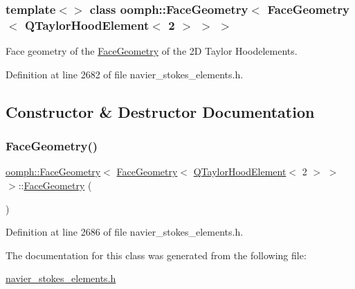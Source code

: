 \subsubsection*{template$<$$>$\newline
class oomph\+::\+Face\+Geometry$<$ Face\+Geometry$<$ Q\+Taylor\+Hood\+Element$<$ 2 $>$ $>$ $>$}

Face geometry of the \hyperlink{classoomph_1_1FaceGeometry}{Face\+Geometry} of the 2D Taylor Hoodelements. 

Definition at line 2682 of file navier\+\_\+stokes\+\_\+elements.\+h.



\subsection{Constructor \& Destructor Documentation}
\mbox{\label{classoomph_1_1FaceGeometry_3_01FaceGeometry_3_01QTaylorHoodElement_3_012_01_4_01_4_01_4_a88d96f17708ec8b3dd50587a99e7d5a9}} 
\subsubsection{\texorpdfstring{Face\+Geometry()}{FaceGeometry()}}
{\footnotesize\ttfamily \hyperlink{classoomph_1_1FaceGeometry}{oomph\+::\+Face\+Geometry}$<$ \hyperlink{classoomph_1_1FaceGeometry}{Face\+Geometry}$<$ \hyperlink{classoomph_1_1QTaylorHoodElement}{Q\+Taylor\+Hood\+Element}$<$ 2 $>$ $>$ $>$\+::\hyperlink{classoomph_1_1FaceGeometry}{Face\+Geometry} (\begin{DoxyParamCaption}{ }\end{DoxyParamCaption})\hspace{0.3cm}{\ttfamily [inline]}}



Definition at line 2686 of file navier\+\_\+stokes\+\_\+elements.\+h.



The documentation for this class was generated from the following file\+:\begin{DoxyCompactItemize}
\item 
\hyperlink{navier__stokes__elements_8h}{navier\+\_\+stokes\+\_\+elements.\+h}\end{DoxyCompactItemize}
